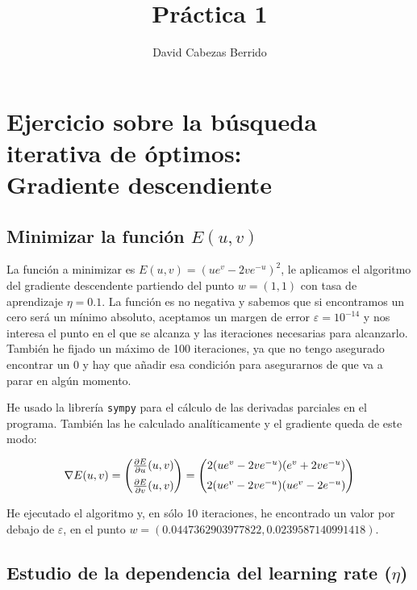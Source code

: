 \documentclass[a4]{article}
\author{David Cabezas Berrido}
\date{\vspace{-5mm}}
\title{\huge Práctica 1 \HRule\vspace{-4mm}}
\begin{document}
\maketitle
\tableofcontents

\section{Ejercicio sobre la búsqueda iterativa de óptimos: \\ Gradiente descendiente}

\subsection{Minimizar la función $E(u,v)$}

La función a minimizar es $E(u,v)=(ue^v-2ve^{-u})^2$, le aplicamos el algoritmo del gradiente 
descendente partiendo del punto $w=(1,1)$ con tasa de aprendizaje $\eta=0.1$.
La función es no negativa y sabemos que si encontramos un cero será un mínimo absoluto,
aceptamos un margen de error $\varepsilon=10^{-14}$ y nos interesa el punto en el que se alcanza
y las iteraciones necesarias para alcanzarlo. También he fijado un máximo de 100 iteraciones,
ya que no tengo asegurado encontrar un 0 y hay que añadir esa condición para asegurarnos
de que va a parar en algún momento.

He usado la librería \texttt{sympy} para el cálculo de las derivadas parciales en el programa.
También las he calculado analíticamente y el gradiente queda de este modo:

\begin{equation*}
\nabla E(u,v)=
\begin{pmatrix}
\frac{\partial E}{\partial u}(u,v) \vspace{2mm}\\
\frac{\partial E}{\partial v}(u,v)
\end{pmatrix}=
\begin{pmatrix}
    2(ue^v-2ve^{-u})(e^v+2ve^{-u}) \vspace{2mm}\\
    2(ue^v-2ve^{-u})(ue^v-2e^{-u})
    \end{pmatrix}
\end{equation*}

He ejecutado el algoritmo y, en sólo 10 iteraciones, he encontrado un valor por debajo de $\varepsilon$,
en el punto $w=(0.0447362903977822,0.0239587140991418)$.

\subsection{Estudio de la dependencia del \textbf{learning rate} ($\eta$)}
\end{document}
